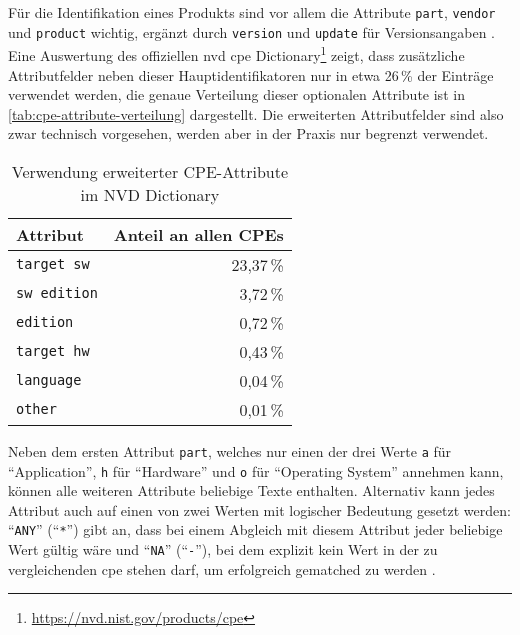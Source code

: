 Für die Identifikation eines Produkts sind vor allem die Attribute \texttt{part}, \texttt{vendor} und \texttt{product} wichtig, ergänzt durch \texttt{version} und \texttt{update} für Versionsangaben \autocite{Cheikes_Waltermire_Scarfone_2011}.
Eine Auswertung des offiziellen \acrshort{nvd} \acrshort{cpe} Dictionary\footnote{\url{https://nvd.nist.gov/products/cpe}} zeigt, dass zusätzliche Attributfelder neben dieser Hauptidentifikatoren nur in etwa 26\,\% der Einträge verwendet werden, die genaue Verteilung dieser optionalen Attribute ist in \autoref{tab:cpe-attribute-verteilung} dargestellt.
Die erweiterten Attributfelder sind also zwar technisch vorgesehen, werden aber in der Praxis nur begrenzt verwendet.

\begin{table}[h]
    \centering
    \begin{tabular}{lr}
        \toprule
        \textbf{Attribut}   & \textbf{Anteil an allen CPEs} \\
        \midrule
        \texttt{target sw}  & 23{,}37\,\%                   \\
        \texttt{sw edition} & 3{,}72\,\%                    \\
        \texttt{edition}    & 0{,}72\,\%                    \\
        \texttt{target hw}  & 0{,}43\,\%                    \\
        \texttt{language}   & 0{,}04\,\%                    \\
        \texttt{other}      & 0{,}01\,\%                    \\
        \bottomrule
    \end{tabular}
    \caption{Verwendung erweiterter CPE-Attribute im NVD Dictionary}
    \label{tab:cpe-attribute-verteilung}
\end{table}

Neben dem ersten Attribut \texttt{part}, welches nur einen der drei Werte \texttt{a} für \enquote{Application}, \texttt{h} für \enquote{Hardware} und \texttt{o} für \enquote{Operating System} annehmen kann, können alle weiteren Attribute beliebige Texte enthalten.
Alternativ kann jedes Attribut auch auf einen von zwei Werten mit logischer Bedeutung gesetzt werden:
\enquote{\texttt{ANY}} (\enquote{\texttt{*}}) gibt an, dass bei einem Abgleich mit diesem Attribut jeder beliebige Wert gültig wäre und \enquote{\texttt{NA}} (\enquote{\texttt{-}}), bei dem explizit kein Wert in der zu vergleichenden \acrshort{cpe} stehen darf, um erfolgreich gematched zu werden \autocite{Parmelee_Booth_Waltermire_Scarfone_2011}.

